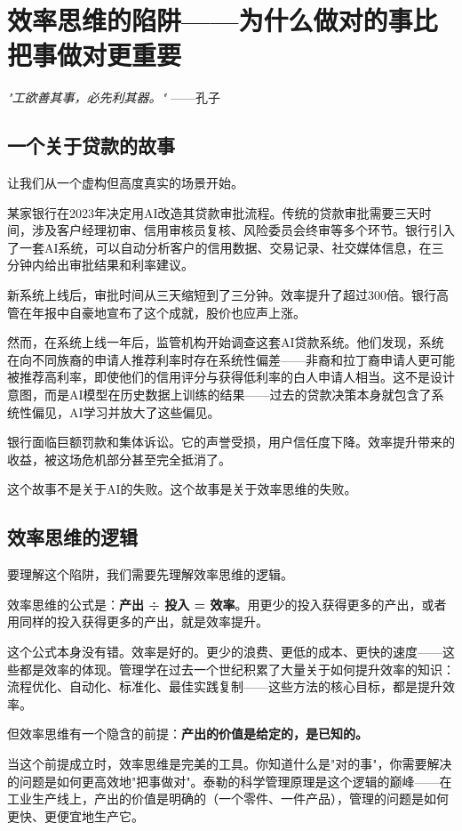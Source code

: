 \chapter{效率思维的陷阱——为什么做对的事比把事做对更重要}


\textit{"工欲善其事，必先利其器。"}
——孔子


\section{一个关于贷款的故事}


让我们从一个虚构但高度真实的场景开始。

某家银行在2023年决定用AI改造其贷款审批流程。传统的贷款审批需要三天时间，涉及客户经理初审、信用审核员复核、风险委员会终审等多个环节。银行引入了一套AI系统，可以自动分析客户的信用数据、交易记录、社交媒体信息，在三分钟内给出审批结果和利率建议。

新系统上线后，审批时间从三天缩短到了三分钟。效率提升了超过300倍。银行高管在年报中自豪地宣布了这个成就，股价也应声上涨。

然而，在系统上线一年后，监管机构开始调查这套AI贷款系统。他们发现，系统在向不同族裔的申请人推荐利率时存在系统性偏差——非裔和拉丁裔申请人更可能被推荐高利率，即使他们的信用评分与获得低利率的白人申请人相当。这不是设计意图，而是AI模型在历史数据上训练的结果——过去的贷款决策本身就包含了系统性偏见，AI学习并放大了这些偏见。

银行面临巨额罚款和集体诉讼。它的声誉受损，用户信任度下降。效率提升带来的收益，被这场危机部分甚至完全抵消了。

这个故事不是关于AI的失败。这个故事是关于效率思维的失败。


\section{效率思维的逻辑}


要理解这个陷阱，我们需要先理解效率思维的逻辑。

效率思维的公式是：\textbf{产出 ÷ 投入 = 效率}。用更少的投入获得更多的产出，或者用同样的投入获得更多的产出，就是效率提升。

这个公式本身没有错。效率是好的。更少的浪费、更低的成本、更快的速度——这些都是效率的体现。管理学在过去一个世纪积累了大量关于如何提升效率的知识：流程优化、自动化、标准化、最佳实践复制——这些方法的核心目标，都是提升效率。

但效率思维有一个隐含的前提：\textbf{产出的价值是给定的，是已知的。}

当这个前提成立时，效率思维是完美的工具。你知道什么是"对的事"，你需要解决的问题是如何更高效地"把事做对"。泰勒的科学管理原理是这个逻辑的巅峰——在工业生产线上，产出的价值是明确的（一个零件、一件产品），管理的问题是如何更快、更便宜地生产它。

